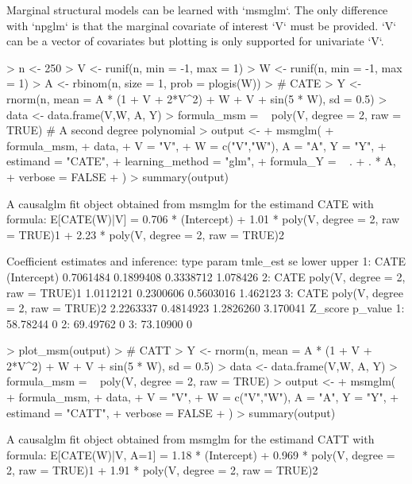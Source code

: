 \documentclass[article]{jss}
\begin{document}
Marginal structural models can be learned with `msmglm`. The only difference with `npglm` is that the marginal covariate of interest `V` must be provided. `V` can be a vector of covariates but plotting is only supported for univariate `V`. 
\begin{Schunk}
\begin{Sinput}
> n <- 250
> V <- runif(n, min = -1, max = 1)
> W <- runif(n, min = -1, max = 1)
> A <- rbinom(n, size = 1, prob = plogis(W))
> # CATE
> Y <- rnorm(n, mean = A * (1 + V + 2*V^2) + W + V + sin(5 * W), sd = 0.5)
> data <- data.frame(V,W, A, Y)
> formula_msm = ~ poly(V, degree = 2, raw = TRUE) # A second degree polynomial
> output <-
+   msmglm(
+     formula_msm,
+     data,
+    V = "V",
+     W = c("V","W"), A = "A", Y = "Y",
+     estimand = "CATE",
+     learning_method = "glm",
+     formula_Y = ~ . + . * A,
+     verbose = FALSE
+   )
> summary(output)
\end{Sinput}
\begin{Soutput}
A causalglm fit object obtained from msmglm for the estimand CATE with formula: 
E[CATE(W)|V] = 0.706 * (Intercept) + 1.01 * poly(V, degree = 2, raw = TRUE)1 + 2.23 * poly(V, degree = 2, raw = TRUE)2

Coefficient estimates and inference:
   type                            param  tmle_est        se     lower    upper
1: CATE                      (Intercept) 0.7061484 0.1899408 0.3338712 1.078426
2: CATE poly(V, degree = 2, raw = TRUE)1 1.0112121 0.2300606 0.5603016 1.462123
3: CATE poly(V, degree = 2, raw = TRUE)2 2.2263337 0.4814923 1.2826260 3.170041
    Z_score p_value
1: 58.78244       0
2: 69.49762       0
3: 73.10900       0
\end{Soutput}
\begin{Sinput}
> plot_msm(output)
> # CATT
> Y <- rnorm(n, mean = A * (1 + V + 2*V^2) + W + V + sin(5 * W), sd = 0.5)
> data <- data.frame(V,W, A, Y)
> formula_msm = ~ poly(V, degree = 2, raw = TRUE) 
> output <-
+   msmglm(
+     formula_msm,
+     data,
+     V = "V",
+     W = c("V","W"), A = "A", Y = "Y",
+     estimand = "CATT",
+     verbose = FALSE
+   )
> summary(output)
\end{Sinput}
\begin{Soutput}
A causalglm fit object obtained from msmglm for the estimand CATT with formula: 
E[CATE(W)|V, A=1] = 1.18 * (Intercept) + 0.969 * poly(V, degree = 2, raw = TRUE)1 + 1.91 * poly(V, degree = 2, raw = TRUE)2


\end{Soutput}
\end{Schunk}
\end{document}

